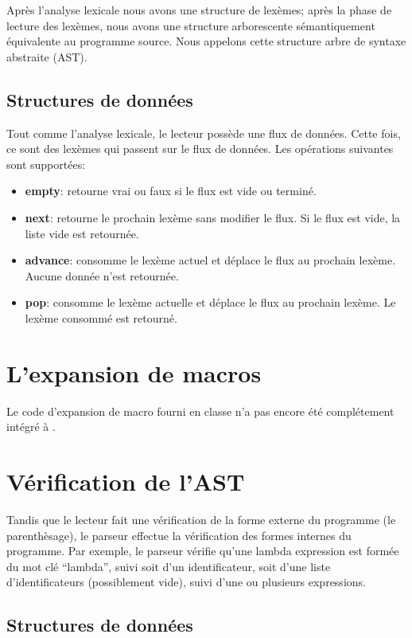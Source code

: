 \documentclass[11pt]{report}
\begin{document}
Après l'analyse lexicale nous avons une structure de lexèmes; après la phase
de lecture des lexèmes, nous avons une structure arborescente sémantiquement
équivalente au programme source. Nous appelons cette structure arbre de
syntaxe abstraite (AST).

\subsection{Structures de données}

Tout comme l'analyse lexicale, le lecteur possède une flux de
données.  Cette fois, ce sont des lexèmes qui passent sur le flux de
données.  Les opérations suivantes sont supportées:

\begin{itemize}
\item {\bf empty}: retourne vrai ou faux si le flux est vide ou terminé.
\item {\bf next}: retourne le prochain lexème sans modifier le flux.
  Si le flux est vide, la liste vide est retournée.
\item {\bf advance}: consomme le lexème actuel et déplace le flux au
  prochain lexème.  Aucune donnée n'est retournée.
\item {\bf pop}: consomme le lexème actuelle et déplace le flux au
  prochain lexème.  Le lexème consommé est retourné.
\end{itemize}

\section{L'expansion de macros}

Le code d'expansion de macro fourni en classe n'a pas encore été complétement
intégré à \sins{}.

\section{Vérification de l'AST}

Tandis que le lecteur fait une vérification de la forme externe du programme
(le parenthèsage), le parseur effectue la vérification des formes internes du
programme. Par exemple, le parseur vérifie qu'une lambda expression est formée
du mot clé ``lambda'', suivi soit d'un identificateur, soit d'une liste
d'identificateurs (possiblement vide), suivi d'une ou plusieurs expressions.

\subsection{Structures de données}
\end{document}
